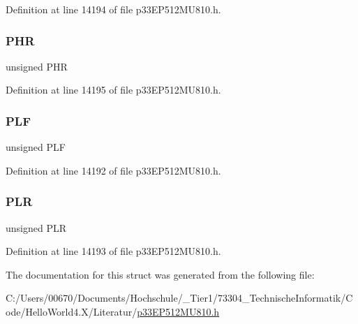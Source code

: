 Definition at line 14194 of file p33\+E\+P512\+M\+U810.\+h.

\mbox{\label{structtag_l_e_b_c_o_n1_b_i_t_s_ae02a9c6926c3a1feac21cec18a520e4a}} 
\subsubsection{\texorpdfstring{P\+HR}{PHR}}
{\footnotesize\ttfamily unsigned P\+HR}



Definition at line 14195 of file p33\+E\+P512\+M\+U810.\+h.

\mbox{\label{structtag_l_e_b_c_o_n1_b_i_t_s_ab72be8b35e01107182afb8e9733d72bb}} 
\subsubsection{\texorpdfstring{P\+LF}{PLF}}
{\footnotesize\ttfamily unsigned P\+LF}



Definition at line 14192 of file p33\+E\+P512\+M\+U810.\+h.

\mbox{\label{structtag_l_e_b_c_o_n1_b_i_t_s_a5f690459b53fc81b46dbbac226cecb25}} 
\subsubsection{\texorpdfstring{P\+LR}{PLR}}
{\footnotesize\ttfamily unsigned P\+LR}



Definition at line 14193 of file p33\+E\+P512\+M\+U810.\+h.



The documentation for this struct was generated from the following file\+:\begin{DoxyCompactItemize}
\item 
C\+:/\+Users/00670/\+Documents/\+Hochschule/\+\_\+\+Tier1/73304\+\_\+\+Technische\+Informatik/\+Code/\+Hello\+World4.\+X/\+Literatur/\hyperlink{p33_e_p512_m_u810_8h}{p33\+E\+P512\+M\+U810.\+h}\end{DoxyCompactItemize}
